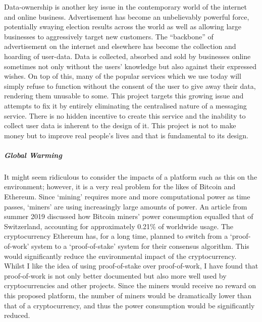 \documentclass{article}
\begin{document}
Data-ownership is another key issue in the contemporary world of the internet and online business. Advertisement has become an unbelievably powerful force, potentially swaying election results across the world as well as allowing large businesses to aggressively target new customers. The ``backbone'' of advertisement on the internet and elsewhere has become the collection and hoarding of user-data. Data is collected, absorbed and sold by businesses online sometimes not only without the users' knowledge but also against their expressed wishes. On top of this, many of the popular services which we use today will simply refuse to function without the consent of the user to give away their data, rendering them unusable to some. This project targets this growing issue and attempts to fix it by entirely eliminating the centralised nature of a messaging service. There is no hidden incentive to create this service and the inability to collect user data is inherent to the design of it. This project is not to make money but to improve real people's lives and that is fundamental to its design. 

\subparagraph{Global Warming}
It might seem ridiculous to consider the impacts of a platform such as this on the environment; however, it is a very real problem for the likes of Bitcoin and Ethereum. Since `mining' requires more and more computational power as time passes, `miners' are using increasingly large amounts of power. An article\cite{ethics_gw_bbc} from summer 2019 discussed how Bitcoin miners' power consumption equalled that of Switzerland, accounting for approximately 0.21\% of worldwide usage. The cryptocurrency Ethereum has, for a long time, planned to switch from a `proof-of-work' system to a `proof-of-stake' system for their consensus algorithm. This would significantly reduce the environmental impact of the cryptocurrency. Whilst I like the idea of using proof-of-stake over proof-of-work, I have found that proof-of-work is not only better documented but also more well used by cryptocurrencies and other projects. Since the miners would receive no reward on this proposed platform, the number of miners would be dramatically lower than that of a cryptocurrency, and thus the power consumption would be significantly reduced.
\end{document}
